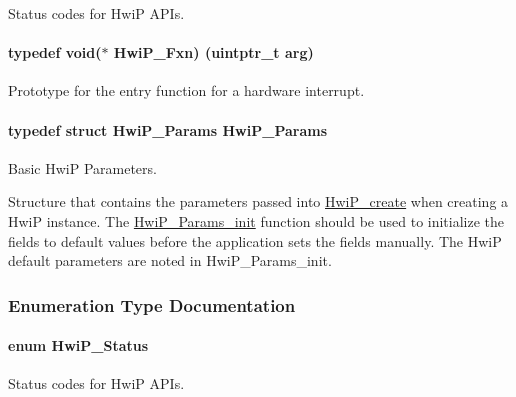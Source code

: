 Status codes for Hwi\+P A\+P\+Is. 

\paragraph[{Hwi\+P\+\_\+\+Fxn}]{\setlength{\rightskip}{0pt plus 5cm}typedef void($\ast$ Hwi\+P\+\_\+\+Fxn) (uintptr\+\_\+t arg)}\label{_hwi_p_8h_a53a36fe33e22847927ceddbb63fb50c7}


Prototype for the entry function for a hardware interrupt. 

\paragraph[{Hwi\+P\+\_\+\+Params}]{\setlength{\rightskip}{0pt plus 5cm}typedef struct {\bf Hwi\+P\+\_\+\+Params}  {\bf Hwi\+P\+\_\+\+Params}}\label{_hwi_p_8h_a7eefe35fc4269b78348f74e5db9c4dca}


Basic Hwi\+P Parameters. 

Structure that contains the parameters passed into \hyperlink{_hwi_p_8h_a3d80df47f0bdcbb6e562ee7b96a40af5}{Hwi\+P\+\_\+create} when creating a Hwi\+P instance. The \hyperlink{_hwi_p_8h_a33f02161b1837b41f08ba064f1001045}{Hwi\+P\+\_\+\+Params\+\_\+init} function should be used to initialize the fields to default values before the application sets the fields manually. The Hwi\+P default parameters are noted in Hwi\+P\+\_\+\+Params\+\_\+init. 

\subsubsection{Enumeration Type Documentation}
\paragraph[{Hwi\+P\+\_\+\+Status}]{\setlength{\rightskip}{0pt plus 5cm}enum {\bf Hwi\+P\+\_\+\+Status}}\label{_hwi_p_8h_a8f508a9a62c31a942ffc9438f53dd258}


Status codes for Hwi\+P A\+P\+Is. 

